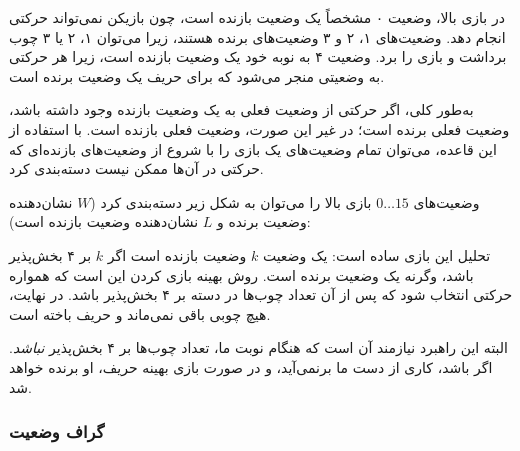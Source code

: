 در بازی بالا، وضعیت ۰ مشخصاً یک
وضعیت بازنده است، چون بازیکن نمی‌تواند
حرکتی انجام دهد.
وضعیت‌های ۱، ۲ و ۳ وضعیت‌های برنده هستند،
زیرا می‌توان ۱، ۲ یا ۳ چوب برداشت
و بازی را برد.
وضعیت ۴ به نوبه خود یک وضعیت بازنده است،
زیرا هر حرکتی به وضعیتی منجر می‌شود که
برای حریف یک وضعیت برنده است.

به‌طور کلی، اگر حرکتی از وضعیت فعلی
به یک وضعیت بازنده وجود داشته باشد،
وضعیت فعلی برنده است؛
در غیر این صورت، وضعیت فعلی بازنده است.
با استفاده از این قاعده، می‌توان تمام وضعیت‌های یک بازی را
با شروع از وضعیت‌های بازنده‌ای که حرکتی در آن‌ها ممکن نیست دسته‌بندی کرد.

وضعیت‌های $0 \ldots 15$ بازی بالا
را می‌توان به شکل زیر دسته‌بندی کرد
($W$ نشان‌دهنده وضعیت برنده و $L$ نشان‌دهنده وضعیت بازنده است):
\begin{center}
\end{center}

تحلیل این بازی ساده است:
یک وضعیت $k$ وضعیت بازنده است اگر $k$ بر
۴ بخش‌پذیر باشد، وگرنه یک وضعیت
برنده است.
روش بهینه بازی کردن این است که
همواره حرکتی انتخاب شود که پس از آن
تعداد چوب‌ها در دسته
بر ۴ بخش‌پذیر باشد.
در نهایت، هیچ چوبی باقی نمی‌ماند و
حریف باخته است.

البته این راهبرد نیازمند آن است که
هنگام نوبت ما، تعداد چوب‌ها بر ۴ بخش‌پذیر
\emph{نباشد}.
اگر باشد، کاری از دست ما برنمی‌آید،
و در صورت بازی بهینه حریف، او
برنده خواهد شد.

\subsubsection{گراف وضعیت}

